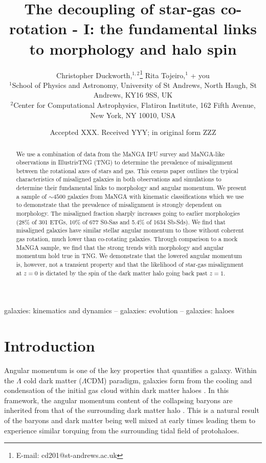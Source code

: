 \documentclass[fleqn,usenatbib]{mnras}
\title[The decoupling of star-gas co-rotation - I]{The decoupling of star-gas co-rotation - I: the fundamental links to morphology and halo spin}
\author[C. Duckworth et al.]{Christopher Duckworth,$^{1,2}$\thanks{E-mail: cd201@st-andrews.ac.uk}
Rita Tojeiro,$^{1}$
+ you
\\
{}$^{1}$School of Physics and Astronomy, University of St Andrews, North Haugh, St Andrews, KY16 9SS, UK\\
$^{2}$Center for Computational Astrophysics, Flatiron Institute, 162 Fifth Avenue, New York, NY 10010, USA\\
}
\date{Accepted XXX. Received YYY; in original form ZZZ}
\begin{document}
\label{firstpage}
\pagerange{\pageref{firstpage}--\pageref{lastpage}}
\maketitle

\begin{abstract}
We use a combination of data from the MaNGA IFU survey and MaNGA-like observations in IllustrisTNG (TNG) to determine the prevalence of misalignment between the rotational axes of stars and gas. This census paper outlines the typical characteristics of misaligned galaxies in both observations and simulations to determine their fundamental links to morphology and angular momentum. We present a sample of $\sim 4500$ galaxies from MaNGA with kinematic classifications which we use to demonstrate that the prevalence of misalignment is strongly dependent on morphology. The misaligned fraction sharply increases going to earlier morphologies (28\% of 301 ETGs, 10\% of 677 S0-Sas and 5.4\% of 1634 Sb-Sds). We find that misaligned galaxies have similar stellar angular momentum to those without coherent gas rotation, much lower than co-rotating galaxies. Through comparison to a mock MaNGA sample, we find that the strong trends with morphology and angular momentum hold true in TNG. 
We demonstrate that the lowered angular momentum is, however, not a transient property and that the likelihood of star-gas misalignment at $z = 0$ is dictated by the spin of the dark matter halo going back past $z = 1$. 
\end{abstract}

\begin{keywords}
galaxies: kinematics and dynamics -- galaxies: evolution -- galaxies: haloes
\end{keywords}
\section{Introduction}
Angular momentum is one of the key properties that quantifies a galaxy. Within the $\Lambda$ cold dark matter ($\Lambda$CDM) paradigm, galaxies form from the cooling and condensation of the initial gas cloud within dark matter haloes \citep{fall1980, mo1998}. In this framework, the angular momentum content of the collapsing baryons are inherited from that of the surrounding dark matter halo \citep[tidal torque theory (TTT); e.g.][]{hoyle1951, peebles1969, Doroshkevich1970}. This is a natural result of the baryons and dark matter being well mixed at early times leading them to experience similar torquing from the surrounding tidal field of protohaloes. 
\end{document}
